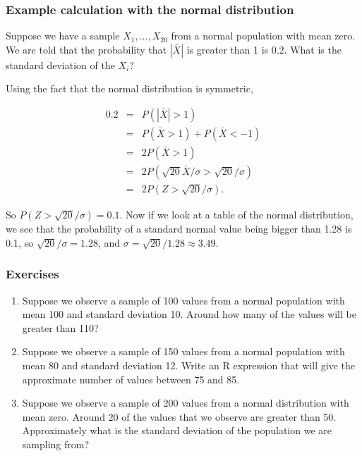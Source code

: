 \begin{frame}
\frametitle{Example calculation with the normal distribution}

Suppose we have a sample $X_1, \ldots, X_{20}$ from a normal
population with mean zero.  We are told that the probability that
$|\bar{X}|$ is greater than 1 is 0.2.  What is the standard deviation
of the $X_i$?

Using the fact that the normal distribution is symmetric,

\begin{eqnarray*}
0.2 &=& P(|\bar{X}| > 1)\\ &=& P(\bar{X}>1) + P(\bar{X}<-1)\\ &=&
2P(\bar{X}>1)\\ &=&
2P(\sqrt{20}\bar{X}/\sigma>\sqrt{20}/\sigma)\\ &=& 2P(Z >
\sqrt{20}/\sigma).
\end{eqnarray*}

So $P(Z > \sqrt{20}/\sigma) = 0.1$.  Now if we look at a table of the
normal distribution, we see that the probability of a standard normal
value being bigger than 1.28 is 0.1, so $\sqrt{20}/\sigma = 1.28$, and
$\sigma = \sqrt{20}/1.28 \approx 3.49$.

\end{frame}


\begin{frame}
\frametitle{Exercises}

\begin{enumerate}

\item Suppose we observe a sample of 100 values from a normal
 population with mean 100 and standard deviation 10.  Around how many
 of the values will be greater than 110?

\item Suppose we observe a sample of 150 values from a normal
 population with mean 80 and standard deviation 12.  Write an R
 expression that will give the approximate number of values between
 75 and 85.

\item Suppose we observe a sample of 200 values from a normal
 distribution with mean zero.  Around 20 of the values that we
 observe are greater than 50.  Approximately what is the standard
 deviation of the population we are sampling from?

\end{enumerate}

\end{frame}

